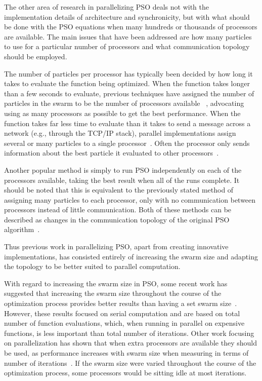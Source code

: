 \documentclass[smallcondensed]{svjour3}
\begin{document}
The other area of research in parallelizing PSO deals not with the
implementation details of architecture and synchronicity, but with what should
be done with the PSO equations when many hundreds or thousands of processors
are available.  The main issues that have been addressed are how many particles
to use for a particular number of processors and what communication topology
should be employed.

The number of particles per processor has typically been decided by how long it
takes to evaluate the function being optimized.  When the function takes longer
than a few seconds to evaluate, previous techniques have assigned the number of
particles in the swarm to be the number of processors available~%
\citep{jin-2005-pso-antenna-designs,mcnabb-2009-large-particle-swarms},
advocating using as many processors as possible to get the best performance.
When the function takes far less time to evaluate than it takes to send a
message across a network (e.g., through the TCP/IP stack), parallel
implementations assign several or many particles to a single
processor~\citep{chu-2006-intelligent-parallel-pso,
chang-2005-parallel-pso-with-communication-strategies}.  Often the processor
only sends information about the best particle it evaluated to other
processors~\citep{belal-2004-parallel-models-for-pso}.

Another popular method is simply to run PSO independently on each of the
processors available, taking the best result when all of the runs complete.  It
should be noted that this is equivalent to the previously stated method of
assigning many particles to each processor, only with no communication between
processors instead of little communication.  Both of these methods can be
described as changes in the communication topology of the original PSO
algorithm~\citep{mcnabb-2009-large-particle-swarms}.

Thus previous work in parallelizing PSO, apart from creating innovative
implementations, has consisted entirely of increasing the swarm size and
adapting the topology to be better suited to parallel computation.

With regard to increasing the swarm size in PSO, some recent work has suggested
that increasing the swarm size throughout the course of the optimization
process provides better results than having a set swarm
size~\citep{hsieh-2009-efficient-population-utilization-for-pso,
montes-de-oca-2011-incremental-social-learning-pso}.  However, these results
focused on serial computation and are based on total number of function
evaluations, which, when running in parallel on expensive functions, is less
important than total number of iterations.  Other work focusing on
parallelization has shown that when extra processors are available they should
be used, as performance increases with swarm size when measuring in terms of
number of iterations~\citep{mcnabb-2009-large-particle-swarms,
jin-2005-pso-antenna-designs}.  If the swarm size were varied throughout the
course of the optimization process, some processors would be sitting idle at
most iterations.
\end{document}
